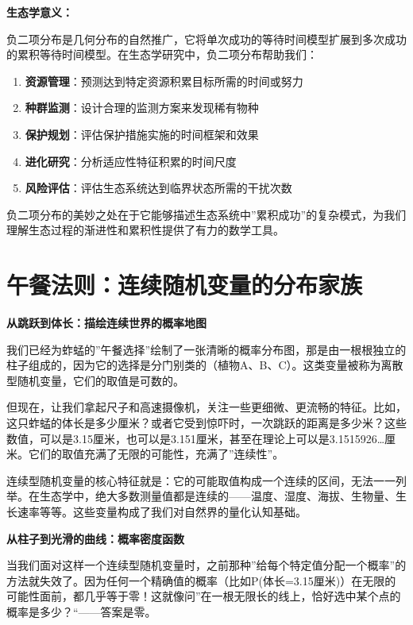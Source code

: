 \documentclass[
  twoside]{book}
\providecommand{\tightlist}{%
  \setlength{\itemsep}{0pt}\setlength{\parskip}{0pt}}
\begin{document}
\textbf{生态学意义：}

负二项分布是几何分布的自然推广，它将单次成功的等待时间模型扩展到多次成功的累积等待时间模型。在生态学研究中，负二项分布帮助我们：

\begin{enumerate}
\def\labelenumi{\arabic{enumi}.}
\tightlist
\item
  \textbf{资源管理}：预测达到特定资源积累目标所需的时间或努力
\item
  \textbf{种群监测}：设计合理的监测方案来发现稀有物种
\item
  \textbf{保护规划}：评估保护措施实施的时间框架和效果
\item
  \textbf{进化研究}：分析适应性特征积累的时间尺度
\item
  \textbf{风险评估}：评估生态系统达到临界状态所需的干扰次数
\end{enumerate}

负二项分布的美妙之处在于它能够描述生态系统中''累积成功''的复杂模式，为我们理解生态过程的渐进性和累积性提供了有力的数学工具。

\hypertarget{ux5348ux9910ux6cd5ux5219ux8fdeux7eedux968fux673aux53d8ux91cfux7684ux5206ux5e03ux5bb6ux65cf}{%
\section{午餐法则：连续随机变量的分布家族}\label{ux5348ux9910ux6cd5ux5219ux8fdeux7eedux968fux673aux53d8ux91cfux7684ux5206ux5e03ux5bb6ux65cf}}

\textbf{从跳跃到体长：描绘连续世界的概率地图}

我们已经为蚱蜢的''午餐选择''绘制了一张清晰的概率分布图，那是由一根根独立的柱子组成的，因为它的选择是分门别类的（植物A、B、C）。这类变量被称为离散型随机变量，它们的取值是可数的。

但现在，让我们拿起尺子和高速摄像机，关注一些更细微、更流畅的特征。比如，这只蚱蜢的体长是多少厘米？或者它受到惊吓时，一次跳跃的距离是多少米？这些数值，可以是3.15厘米，也可以是3.151厘米，甚至在理论上可以是3.1515926\ldots 厘米。它们的取值充满了无限的可能性，充满了''连续性''。

连续型随机变量的核心特征就是：它的可能取值构成一个连续的区间，无法一一列举。在生态学中，绝大多数测量值都是连续的------温度、湿度、海拔、生物量、生长速率等等。这些变量构成了我们对自然界的量化认知基础。

\textbf{从柱子到光滑的曲线：概率密度函数}

当我们面对这样一个连续型随机变量时，之前那种''给每个特定值分配一个概率''的方法就失效了。因为任何一个精确值的概率（比如P(体长=3.15厘米)）在无限的可能性面前，都几乎等于零！这就像问''在一根无限长的线上，恰好选中某个点的概率是多少？``------答案是零。
\end{document}
